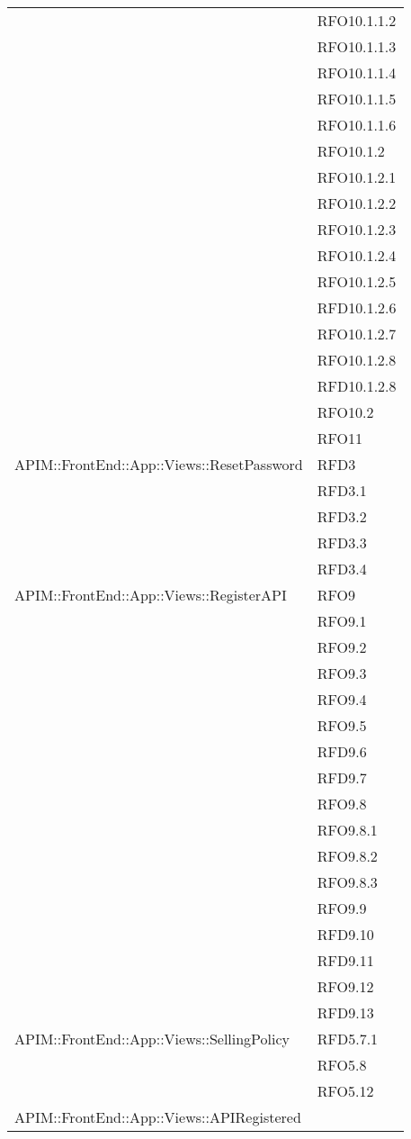 \begin{longtable}{ p{12cm} | p{4cm} }
			& RFO10.1.1.2 \\
			& RFO10.1.1.3 \\
			& RFO10.1.1.4 \\
			& RFO10.1.1.5 \\
			& RFO10.1.1.6 \\
			& RFO10.1.2 \\
			& RFO10.1.2.1 \\
			& RFO10.1.2.2 \\
			& RFO10.1.2.3 \\
			& RFO10.1.2.4 \\
			& RFO10.1.2.5 \\
			& RFD10.1.2.6 \\
			& RFO10.1.2.7 \\
			& RFO10.1.2.8 \\
			& RFD10.1.2.8 \\
			& RFO10.2 \\
			& RFO11 \\
			\hline
			APIM::FrontEnd::App::Views::ResetPassword
			& RFD3 \\
			& RFD3.1 \\
			& RFD3.2 \\
			& RFD3.3 \\
			& RFD3.4 \\
			\hline
			APIM::FrontEnd::App::Views::RegisterAPI
			& RFO9 \\
			& RFO9.1 \\
			& RFO9.2 \\
			& RFO9.3 \\
			& RFO9.4 \\
			& RFO9.5 \\
			& RFD9.6 \\
			& RFD9.7 \\
			& RFO9.8 \\
			& RFO9.8.1 \\
			& RFO9.8.2 \\
			& RFO9.8.3 \\
			& RFO9.9 \\
			& RFD9.10 \\
			& RFD9.11 \\
			& RFO9.12 \\
			& RFD9.13 \\
			\hline
			APIM::FrontEnd::App::Views::SellingPolicy
			& RFD5.7.1 \\
			& RFO5.8 \\
			& RFO5.12 \\
			\hline
			APIM::FrontEnd::App::Views::APIRegistered

\end{longtable}
